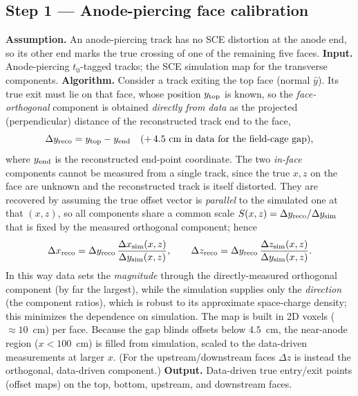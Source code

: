 \subsection{Step 1 --- Anode-piercing face calibration}
\label{ssec:sce-anode}
\textbf{Assumption.} An anode-piercing track has no SCE distortion at the anode
end, so its other end marks the true crossing of one of the remaining five
faces.
\textbf{Input.} Anode-piercing $t_0$-tagged tracks; the SCE simulation map for
the transverse components.
\textbf{Algorithm.} Consider a track exiting the top face (normal $\hat{y}$).
Its true exit must lie on that face, whose position $y_{\rm top}$ is known, so
the \emph{face-orthogonal} component is obtained \emph{directly from data} as the
projected (perpendicular) distance of the reconstructed track end to the face,
\begin{equation}
\Delta y_{\rm reco}=y_{\rm top}-y_{\rm end}\quad(+\,4.5~\text{cm in data for the field-cage gap}),
\end{equation}
where $y_{\rm end}$ is the reconstructed end-point coordinate. The two
\emph{in-face} components cannot be measured from a single track, since the true
$x,z$ on the face are unknown and the reconstructed track is itself distorted.
They are recovered by assuming the true offset vector is \emph{parallel} to the
simulated one at that $(x,z)$, so all components share a common scale
$S(x,z)=\Delta y_{\rm reco}/\Delta y_{\rm sim}$ that is fixed by the measured
orthogonal component; hence
\begin{equation}
\Delta x_{\rm reco}=\Delta y_{\rm reco}\,
\frac{\Delta x_{\rm sim}(x,z)}{\Delta y_{\rm sim}(x,z)},\qquad
\Delta z_{\rm reco}=\Delta y_{\rm reco}\,
\frac{\Delta z_{\rm sim}(x,z)}{\Delta y_{\rm sim}(x,z)} .
\end{equation}
In this way data sets the \emph{magnitude} through the directly-measured
orthogonal component (by far the largest), while the simulation supplies only the
\emph{direction} (the component ratios), which is robust to its approximate
space-charge density; this minimizes the dependence on simulation. The map is
built in 2D voxels ($\approx 10$~cm) per face. Because the gap blinds offsets
below $4.5$~cm, the near-anode region ($x<100$~cm) is filled from simulation,
scaled to the data-driven measurements at larger $x$. (For the
upstream/downstream faces $\Delta z$ is instead the orthogonal, data-driven
component.)
\textbf{Output.} Data-driven true entry/exit points (offset maps) on the top,
bottom, upstream, and downstream faces.

